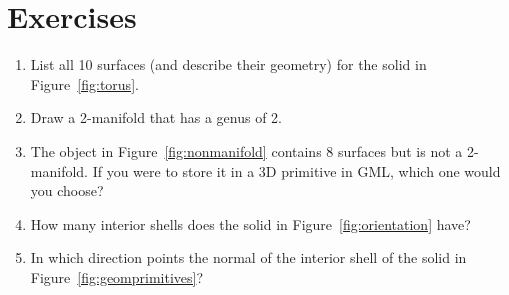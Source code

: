 %
\section{Exercises}

\begin{enumerate}
  \item List all 10 surfaces (and describe their geometry) for the solid in Figure~\ref{fig:torus}.
  \item Draw a 2-manifold that has a genus of 2.
  \item The object in Figure~\ref{fig:nonmanifold} contains 8 surfaces but is not a 2-manifold. If you were to store it in a 3D primitive in GML, which one would you choose? 
  \item How many interior shells does the solid in Figure~\ref{fig:orientation} have?
  \item In which direction points the normal of the interior shell of the solid in Figure~\ref{fig:geomprimitives}?
\end{enumerate}
